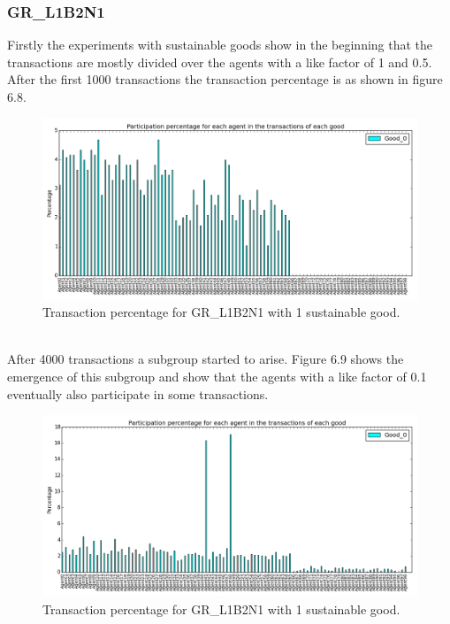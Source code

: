 \documentclass[twoside,openright]{uva-bachelor-thesis}
\begin{document}
\subsubsection{GR\_L1B2N1}
Firstly the experiments with sustainable goods show in the beginning that the transactions are mostly divided over the agents with a like factor of 1 and 0.5. After the first 1000 transactions the transaction percentage is as shown in figure 6.8. \\
\begin{figure}[h!]
\centering
\includegraphics[scale=0.4]{Simulation2_figures/GR_L1B2N1/Figure1_1good_1k}
\caption{Transaction percentage for GR\_L1B2N1 with 1 sustainable good.}
\end{figure}
\\
After 4000 transactions a subgroup started to arise. Figure 6.9 shows the emergence of this subgroup and show that the agents with a like factor of 0.1 eventually also participate in some transactions. \\
\begin{figure}[h!]
\centering
\includegraphics[scale=0.4]{Simulation2_figures/GR_L1B2N1/Figure2_1good_4k} 
\caption{Transaction percentage for GR\_L1B2N1 with 1 sustainable good.}
\end{figure}
\\
\end{document}
